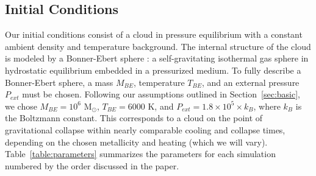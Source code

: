 \documentclass[useAMS,usenatbib]{mn2e}
\newcommand{\msun}{{M$_\odot$}}
\begin{document}

\subsection{Initial Conditions}

Our initial conditions consist of a cloud in pressure equilibrium with a
constant ambient density and temperature background. The internal structure of the
cloud is modeled by a Bonner-Ebert sphere \citep{Bonnor1956}: a self-gravitating
isothermal gas sphere in hydrostatic equilibrium embedded in a pressurized  
medium. To fully describe a Bonner-Ebert sphere, a mass $M_{BE}$, temperature
$T_{BE}$, and an external pressure $P_{ext}$ must be chosen. Following our
assumptions outlined in Section~\ref{sec:basic}, we chose
$M_{BE}=10^6$ \msun, $T_{BE}=6000$ K, and $P_{ext}=1.8\times10^5\times k_B$, 
where $k_B$ is the Boltzmann constant. This corresponds to a cloud on the point of
gravitational collapse within nearly comparable cooling and collapse times,
depending on the chosen metallicity and heating (which we will vary). Table~\ref{table:parameters}
summarizes the parameters for each simulation numbered by the order discussed in the paper.
\end{document}
